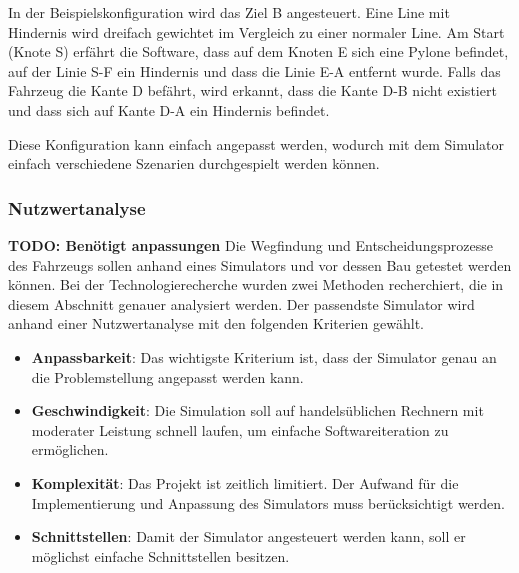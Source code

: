 \documentclass[../main.tex]{subfiles}
\begin{document}
In der Beispielskonfiguration wird das Ziel B angesteuert.
Eine Line mit Hindernis wird dreifach gewichtet im Vergleich zu einer normaler Line.  
Am Start (Knote S) erfährt die Software, dass auf dem Knoten E sich eine Pylone befindet,
auf der Linie S-F ein Hindernis und dass die Linie E-A entfernt wurde.
Falls das Fahrzeug die Kante D befährt, wird erkannt, dass die Kante D-B nicht existiert und dass sich auf Kante D-A ein Hindernis befindet.

Diese Konfiguration kann einfach angepasst werden, wodurch mit dem Simulator einfach verschiedene Szenarien durchgespielt werden können.


\subsubsection{Nutzwertanalyse}
\textbf{TODO: Benötigt anpassungen}
Die Wegfindung und Entscheidungsprozesse des Fahrzeugs sollen anhand eines Simulators und vor dessen Bau getestet werden können. Bei der Technologierecherche wurden zwei Methoden recherchiert, die in diesem Abschnitt genauer analysiert werden.
Der passendste Simulator wird anhand einer Nutzwertanalyse mit den folgenden Kriterien gewählt.

\begin{itemize}
\item \textbf{Anpassbarkeit}: Das wichtigste Kriterium ist, dass der Simulator genau an die Problemstellung angepasst werden kann.
\item \textbf{Geschwindigkeit}: Die Simulation soll auf handelsüblichen Rechnern mit moderater Leistung schnell laufen, um einfache Softwareiteration zu ermöglichen.  
\item \textbf{Komplexität}: Das Projekt ist zeitlich limitiert. Der Aufwand für die Implementierung und Anpassung des Simulators muss berücksichtigt werden.
\item \textbf{Schnittstellen}: Damit der Simulator angesteuert werden kann, soll er möglichst einfache Schnittstellen besitzen.
\end{itemize}
\end{document}
